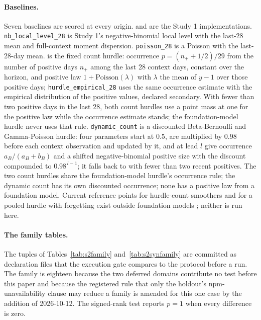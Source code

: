 \paragraph{Baselines.} Seven baselines are scored at every origin. \lm{} and \aets{} are the Study 1
implementations. \texttt{nb\_local\_level\_28} is Study 1's negative-binomial local level with the last-28
mean and full-context moment dispersion. \texttt{poisson\_28} is a Poisson with the last-28-day mean.
\hc{} is the fixed count hurdle: occurrence $p = (n_{+} + 1/2) / 29$ from the number of positive days
$n_{+}$ among the last 28 context days, constant over the horizon, and positive law
$1 + \text{Poisson}(\lambda)$ with $\lambda$ the mean of $y - 1$ over those positive days;
\texttt{hurdle\_empirical\_28} uses the same occurrence estimate with the empirical distribution of the
positive values, declared secondary. With fewer than two positive days in the last 28, both count hurdles
use a point mass at one for the positive law while the occurrence estimate stands; the foundation-model
hurdle never uses that rule. \texttt{dynamic\_count} is a discounted Beta-Bernoulli and Gamma-Poisson
hurdle: four parameters start at $0.5$, are multiplied by $0.98$ before each context observation and
updated by it, and at lead $l$ give occurrence $a_B / (a_B + b_B)$ and a shifted negative-binomial positive
size with the discount compounded to $0.98^{\,l-1}$; it falls back to \hc{} with fewer than two recent
positives. The two count hurdles share the foundation-model hurdle's occurrence rule; the dynamic count has
its own discounted occurrence; none has a positive law from a foundation model. Current reference points
for hurdle-count smoothers and for a pooled hurdle with forgetting exist outside foundation models
\citep{damato2026, bai2026}; neither is run here.

\paragraph{The family tables.} The tuples of Tables~\ref{tab:s2family} and~\ref{tab:s2synfamily} are
committed as declaration files that the execution gate compares to the protocol before a run. The family
is eighteen because the two deferred domains contribute no test before this paper and because the
registered rule that only the holdout's npm-unavailability clause may reduce a family is amended for this
one case by the addition of 2026-10-12. The signed-rank test reports $p = 1$ when every difference is
zero.

